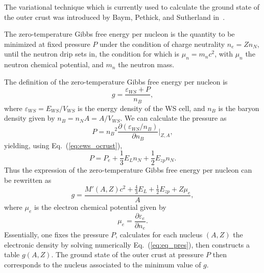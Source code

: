 The variational technique which is currently used to calculate the ground state 
of the outer crust was introduced by Baym, Pethick, and Sutherland 
in~\cite{BPS}.

The zero-temperature Gibbs free energy per nucleon is the quantity to be minimized at fixed 
pressure $P$ under the condition of charge neutrality $n_e = Zn_N$, until the 
neutron drip sets in, the condition for which is $\mu_n =
m_n c^2$, with $\mu_n$ the neutron chemical potential, and $m_n$ the neutron
mass.

The definition of the zero-temperature Gibbs free energy per nucleon is
%
\begin{equation}
  g = \frac{\varepsilon_{WS} + P}{n_B},
\end{equation}
%
where $\varepsilon_{WS} = E_{WS}/V_{WS}$ is the energy density of the WS cell, and $n_B$ is the
baryon density given by $n_B = n_NA = A/V_{WS}$. 
We can calculate the pressure as
%
\begin{equation}
  P = {n_B}^2\frac{\partial (\varepsilon_{WS}/n_B)}{\partial n_B}\Bigr|_{Z,A},
\end{equation}
%
yielding, using Eq.~(\ref{eq:ews_ocrust}),
%
\begin{equation}
  P = P_e + \frac{1}{3}E_Ln_N + \frac{1}{2}E_{zp}n_N.\label{eq:eq_pres}
\end{equation}
%
Thus the expression of the zero-temperature Gibbs free energy per nucleon
can be rewritten as 
%
\begin{equation}
  g = \frac{M'(A,Z)c^2 + \frac{4}{3}E_L + \frac{1}{2}E_{zp} + Z\mu_e}{A},
\end{equation}
%
where $\mu_e$ is the electron chemical potential given by
%
\begin{equation}
  \mu_e = \frac{\partial \varepsilon_e}{\partial n_e}.
\end{equation}
%
Essentially, one fixes the pressure $P$, calculates for each nucleus $(A,Z)$ 
the electronic density by solving numerically Eq.~(\ref{eq:eq_pres}), then
constructs a table $g(A,Z)$. The ground state of the outer crust at pressure
$P$ then corresponds to the nucleus associated to the minimum value of $g$.

